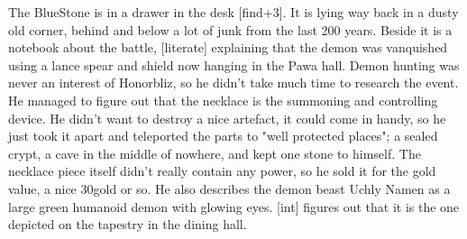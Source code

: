 The BlueStone is in a drawer in the desk [find+3]. It is lying way back in a dusty old corner, behind and below a lot of junk from the last 200 years. Beside it is a notebook about the battle, [literate] explaining that the demon was vanquished using a lance spear and shield now hanging in the Pawa hall. Demon hunting was never an interest of Honorbliz, so he didn't take much time to research the event. He managed to figure out that the necklace is the summoning and controlling device. He didn't want to destroy a nice artefact, it could come in handy, so he just took it apart and teleported the parts to "well protected places"; a sealed crypt, a cave in the middle of nowhere, and kept one stone to himself. The necklace piece itself didn't really contain any power, so he sold it for the gold value, a nice 30gold or so. He also describes the demon beast Uchly Namen as a large green humanoid demon with glowing eyes. [int] figures out that it is the one depicted on the tapestry in the dining hall.

